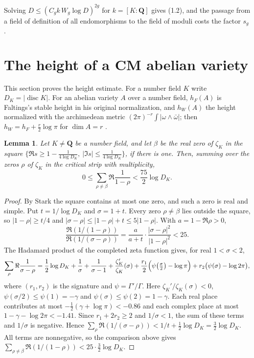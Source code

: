 \documentclass[11pt,a4paper]{article}
\theoremstyle{plain}
\newtheorem{lemma}[theorem]{Lemma}
\theoremstyle{remark}
\newcommand{\Q}{\mathbf Q}
\newcommand{\disc}{\operatorname{disc}}
\begin{document}
Solving $D\leq(C_gk\,W_g\log D)^{2g}$ for $k=[K:\Q]$ gives (1.2), and the passage from a field of definition of all
endomorphisms to the field of moduli costs the factor $s_g$.

\section{The height of a CM abelian variety}

This section proves the height estimate. For a number field $K$ write $D_K=|\disc K|$. For an abelian variety $A$
over a number field, $h_F(A)$ is Faltings's stable height in his original normalization, and $h_W(A)$ the height
normalized with the archimedean metric $(2\pi)^{-r}\int|\omega\wedge\bar\omega|$; then
$h_W=h_F+\tfrac r2\log\pi$ for $\dim A=r$ \cite[\S2.3]{GR14}.

\begin{lemma}\label{lem:zero-sum}
Let $K\neq\Q$ be a number field, and let $\beta$ be the real zero of $\zeta_K$ in the square
$\{\Re s\geq1-\frac1{4\log D_K},\ |\Im s|\leq\frac1{4\log D_K}\}$, if there is one. Then, summing over the zeros
$\rho$ of $\zeta_K$ in the critical strip with multiplicity,
\[
 0\leq\sum_{\rho\neq\beta}\Re\frac1{1-\rho}<\frac{75}2\log D_K.
\]
\end{lemma}

\begin{proof}
By Stark \cite[Lemmas~3 and~4]{Stark} the square contains at most one zero, and such a zero is real and simple. Put
$t=1/\log D_K$ and $\sigma=1+t$. Every zero $\rho\neq\beta$ lies outside the square, so $|1-\rho|\geq t/4$ and
$|\sigma-\rho|\leq|1-\rho|+t\leq5|1-\rho|$. With $a=1-\Re\rho>0$,
\[
 \frac{\Re(1/(1-\rho))}{\Re(1/(\sigma-\rho))}=\frac a{a+t}\cdot\frac{|\sigma-\rho|^2}{|1-\rho|^2}<25.
\]
The Hadamard product of the completed zeta function gives, for real $1<\sigma<2$,
\[
 \sum_\rho\Re\frac1{\sigma-\rho}=\frac12\log D_K+\frac1\sigma+\frac1{\sigma-1}
 +\frac{\zeta_K'}{\zeta_K}(\sigma)+\frac{r_1}2\Bigl(\psi\bigl(\tfrac\sigma2\bigr)-\log\pi\Bigr)
 +r_2\bigl(\psi(\sigma)-\log2\pi\bigr),
\]
where $(r_1,r_2)$ is the signature and $\psi=\Gamma'/\Gamma$. Here $\zeta_K'/\zeta_K(\sigma)<0$, $\psi(\sigma/2)\leq\psi(1)=-\gamma$ and
$\psi(\sigma)\leq\psi(2)=1-\gamma$. Each real place contributes at most $-\frac12(\gamma+\log\pi)<-0.86$ and each
complex place at most $1-\gamma-\log2\pi<-1.41$. Since $r_1+2r_2\geq2$ and $1/\sigma<1$, the sum of these terms and
$1/\sigma$ is negative. Hence $\sum_\rho\Re(1/(\sigma-\rho))<1/t+\frac12\log D_K=\frac32\log D_K$. All terms are
nonnegative, so the comparison above gives
$\sum_{\rho\neq\beta}\Re(1/(1-\rho))<25\cdot\frac32\log D_K$.
\end{proof}
\end{document}
